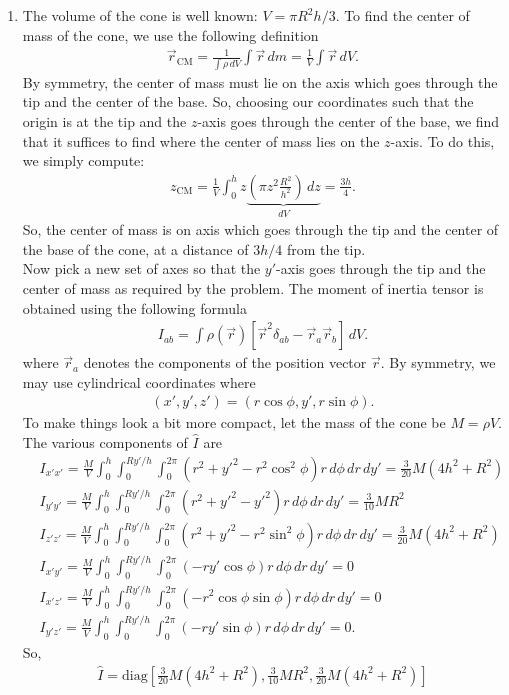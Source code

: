 \documentclass{article}
\theoremstyle{definition}
\newcommand{\f}[2]{\frac{#1}{#2}}
\newcommand{\lp}{\left(}
\newcommand{\rp}{\right)}
\newcommand{\lb}{\left[}
\newcommand{\rb}{\right]}
\begin{document}
\begin{enumerate}[label=(\alph*)]
	\item The volume of the cone is well known: $V = \pi R^2 h/3$. To find the center of mass of the cone, we use the following definition
	\begin{align*}
	\vec{r}_\text{CM} = \f{1}{\int \rho \, dV} \int \vec{r} \,dm = \f{1}{V}\int \vec{r} \,dV.  
	\end{align*}
	By symmetry, the center of mass must lie on the axis which goes through the tip and the center of the base. So, choosing our coordinates such that the origin is at the tip and the $z$-axis goes through the center of the base, we find that it suffices to find where the center of mass lies on the $z$-axis. To do this, we simply compute:
	\begin{align*}
	{z}_\text{CM} =\f{1}{V} \int_{0}^h z\underbrace{\lp \pi z^2 \f{R^2}{h^2} \rp \,dz}_{dV} = \f{3h}{4}.
	\end{align*}
	So, the center of mass is on axis which goes through the tip and the center of the base of the cone, at a distance of $3h/4$ from the tip. \\
	
	Now pick a new set of axes so that the $y'$-axis goes through the tip and the center of mass as required by the problem. The moment of inertia tensor is obtained using the following formula
	\begin{align*}
	I_{ab} = \int \rho(\vec{r}) \lb \vec{r}^2 \delta_{ab} - \vec{r}_a \vec{r}_b \rb \,dV.
	\end{align*}
	where $\vec{r}_a$ denotes the components of the position vector $\vec{r}$. By symmetry, we may use cylindrical coordinates where
	\begin{align*}
	(x',y',z') = (r\cos\phi, y', r\sin\phi).
	\end{align*}
	To make things look a bit more compact, let the mass of the cone be $M = \rho V$. The various components of $\hat{I}$ are
	\begin{align*}
	&I_{x'x'} = \f{M}{V} \int_{0}^h \int_{0}^{Ry'/h} \int_{0}^{2\pi} (r^2 + y'^2 - r^2 \cos^2\phi  )r\,d\phi\,dr\,dy' = \f{3}{20}M(4h^2 + R^2)\\
	&I_{y'y'} = \f{M}{V} \int_{0}^h \int_{0}^{Ry'/h} \int_{0}^{2\pi} (r^2 + y'^2 - y'^2  )r\,d\phi\,dr\,dy' = \f{3}{10}MR^2\\
	&I_{z'z'} = \f{M}{V} \int_{0}^h \int_{0}^{Ry'/h} \int_{0}^{2\pi} (r^2 + y'^2 - r^2 \sin^2\phi )r\,d\phi\,dr\,dy' = \f{3}{20}M(4h^2 + R^2)\\
	&I_{x'y'} = \f{M}{V} \int_{0}^h \int_{0}^{Ry'/h} \int_{0}^{2\pi} ( - r y' \cos\phi  )r\,d\phi\,dr\,dy' = 0 \\
	&I_{x'z'} = \f{M}{V} \int_{0}^h \int_{0}^{Ry'/h} \int_{0}^{2\pi} ( - r^2\cos\phi\sin\phi  )r\,d\phi\,dr\,dy' = 0 \\
	&I_{y'z'} = \f{M}{V} \int_{0}^h \int_{0}^{Ry'/h} \int_{0}^{2\pi} ( - ry'\sin\phi  )r\,d\phi\,dr\,dy' = 0.
	\end{align*}
	So, 
	\begin{align*}
	\boxed{\hat I = \text{diag}\lb \f{3}{20}M(4h^2 + R^2), \f{3}{10}MR^2,  \f{3}{20}M(4h^2 + R^2)\rb}
	\end{align*}
	

\end{enumerate}
\end{document}
